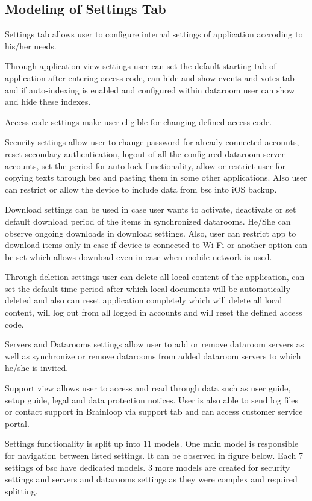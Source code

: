 \subsection{Modeling of Settings Tab}
\par
Settings tab allows user to configure internal settings of application accroding to his/her needs. 
\par
Through application view settings user can set the default starting tab of application after entering access code, can hide and show events and votes tab and if auto-indexing is enabled and configured within dataroom user can show and hide these indexes. 
\par
Access code settings make user eligible for changing defined access code.
\par
Security settings allow user to change password for already connected accounts, reset secondary authentication, logout of all the configured dataroom server accounts, set the period for auto lock functionality, allow or restrict user for copying texts through \acrshort{bsc} and pasting them in some other applications. Also user can restrict or allow the device to include data from \acrshort{bsc} into iOS backup. 
\par
Download settings can be used in case user wants to activate, deactivate or set default download period of the items in synchronized datarooms. He/She can observe ongoing downloads in download settings. Also, user can restrict app to download items only in case if device is connected to Wi-Fi or another option can be set which allows download even in case when mobile network is used. 
\par
Through deletion settings user can delete all local content of the application, can set the default time period after which local documents will be automatically deleted and also can reset application completely which will delete all local content, will log out from all logged in accounts and will reset the defined access code.
\par
Servers and Datarooms settings allow user to add or remove dataroom servers as well as synchronize or remove datarooms from added dataroom servers to which he/she is invited.
\par
Support view allows user to access and read through data such as user guide, setup guide, legal and data protection notices. User is also able to send log files or contact support in Brainloop via support tab and can access customer service portal.
\par
Settings functionality is split up into 11 models. One main model is responsible for navigation between listed settings. It can be observed in figure below. Each 7 settings of \acrshort{bsc} have dedicated models. 3 more models are created for security settings and servers and datarooms settings as they were complex and required splitting.


